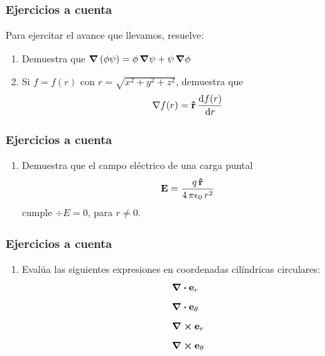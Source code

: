 \documentclass[12pt]{beamer}
\begin{document}
\begin{frame}
\frametitle{Ejercicios a cuenta}
Para ejercitar el avance que llevamos, resuelve:
\begin{enumerate}
\item Demuestra que $\grad{\left( \phi \psi \right)} = \phi \, \grad{\psi} + \psi \, \grad{\phi}$
\item Si $f = f(r)$ con $r = \sqrt{x^{2} + y^{2}+ z^{2}}$, demuestra que
\begin{align*}
\nabla{f(r)} = \vu{r} \, \dv{f(r)}{r}
\end{align*}
\end{enumerate}
\end{frame}
\begin{frame}
\frametitle{Ejercicios a cuenta}
\begin{enumerate}[<+->]
\item Demuestra que el campo eléctrico de una carga puntal
\begin{align*}
\vb{E} = \dfrac{q \, \vu{r}}{4 \, \pi \epsilon_{0} \, r^{2}}
\end{align*}
cumple $\div{E} = 0$, para $r \neq 0$.
\seti
\end{enumerate}
\end{frame}
\begin{frame}
\frametitle{Ejercicios a cuenta}
\begin{enumerate}[<+->]
\conti
\item Evalúa las siguientes expresiones en coordenadas cilíndricas circulares:
\begin{align*}
&\div{\vb{e}_{r}} \\[0.5em]
&\div{\vb{e}_{\theta}} \\[0.5em]
&\curl{\vb{e}_{r}} \\[0.5em]
&\curl{\vb{e}_{\theta}}
\end{align*}
\seti
\end{enumerate}
\end{frame}
\end{document}
